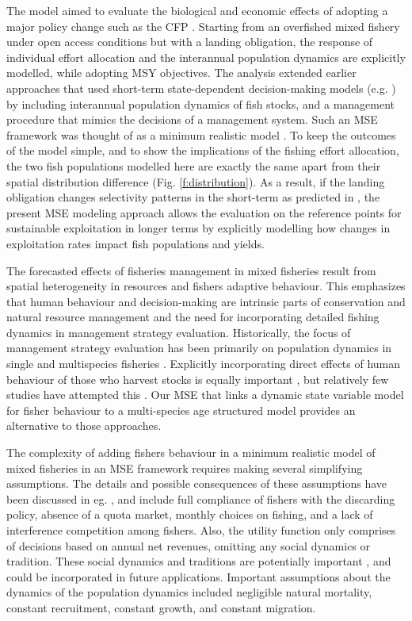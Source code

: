 \documentclass[12pt,oneline,a4paper,numbib]{ouparticle}
\numberwithin{equation}{subsection} %
\begin{document}
The model aimed to evaluate the biological and economic effects of adopting a major policy change such as the CFP \cite{CFP2013}. Starting from an overfished mixed fishery under open access conditions but with a landing obligation, the response of individual effort allocation and the interannual population dynamics are explicitly modelled, while adopting MSY objectives. The analysis extended earlier approaches that used short-term state-dependent decision-making models (e.g. \cite{Alzorriz2018, Batsleer2016, Poos2010}) by including interannual population dynamics of fish stocks, and a management procedure that mimics the decisions of a management system. Such an MSE framework was thought of as a minimum realistic model \cite{Kell2007, Punt1995}. To keep the outcomes of the model simple, and to show the implications of the fishing effort allocation, the two fish populations modelled here are exactly the same apart from their spatial distribution difference (Fig. \ref{f:distribution}). As a result, if the landing obligation changes selectivity patterns in the short-term as predicted in \cite{Alzorriz2018, Batsleer2016}, the present MSE modeling approach allows the evaluation on the reference points for sustainable exploitation in longer terms by explicitly modelling how changes in exploitation rates impact fish populations and yields. 

The forecasted effects of fisheries management in mixed fisheries result from spatial heterogeneity in resources and fishers adaptive behaviour. This emphasizes that human behaviour and decision-making are intrinsic parts of conservation and natural resource management and the need for incorporating detailed fishing dynamics in management strategy evaluation. Historically, the focus of management strategy evaluation has been primarily on population dynamics in single and multispecies fisheries \cite{Butterworth2007, Dichmont2006b, Punt1999, Punt2009, Smith1999, Punt2016}. Explicitly incorporating direct effects of human behaviour of those who harvest stocks is equally important \cite{Fulton2011,Milner-Gulland2012, Link2017}, but relatively few studies have attempted this \cite{Andersen2010, Ono2018, Simons2015a}. Our MSE that links a dynamic state variable model for fisher behaviour to a multi-species age structured model provides an alternative to those approaches. 

The complexity of adding fishers behaviour in a minimum realistic model of mixed fisheries in an MSE framework requires making several simplifying assumptions. The details and possible consequences of these assumptions have been discussed in eg. \cite{Alzorriz2018}, and include full compliance of fishers with the discarding policy, absence of a quota market, monthly choices on fishing, and a lack of interference competition among fishers. Also, the utility function only comprises of decisions based on annual net revenues, omitting any social dynamics or tradition. These social dynamics and traditions are potentially important \cite{Girardin2017, Schluter2012}, and could be incorporated in future applications. Important assumptions about the dynamics of the population dynamics included negligible natural mortality, constant recruitment, constant growth, and constant migration. 
\end{document}

